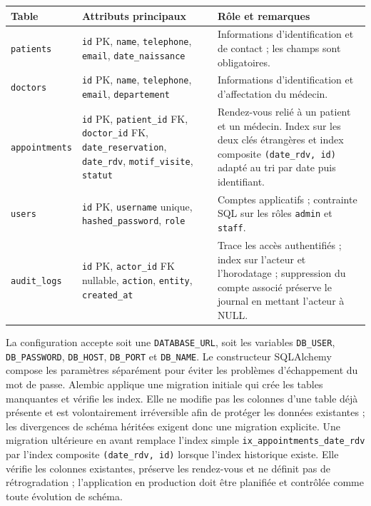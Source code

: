 \documentclass[11pt,a4paper]{report}
\newcommand{\code}[1]{\texttt{#1}}
\begin{document}
\begin{longtable}{>{\raggedright\arraybackslash}p{2.6cm}
                  >{\raggedright\arraybackslash}p{4.3cm}
                  >{\raggedright\arraybackslash}p{6.9cm}}
\toprule
Table & Attributs principaux & Rôle et remarques\\
\midrule
\endhead
\code{patients} & \code{id} PK, \code{name}, \code{telephone},
\code{email}, \code{date\_naissance} & Informations d'identification et de
contact ; les champs sont obligatoires.\\
\code{doctors} & \code{id} PK, \code{name}, \code{telephone},
\code{email}, \code{departement} & Informations d'identification et
d'affectation du médecin.\\
\code{appointments} & \code{id} PK, \code{patient\_id} FK,
\code{doctor\_id} FK, \code{date\_reservation}, \code{date\_rdv},
\code{motif\_visite}, \code{statut} & Rendez-vous relié à un patient et un
médecin. Index sur les deux clés étrangères et index composite
\code{(date\_rdv, id)} adapté au tri par date puis identifiant.\\
\code{users} & \code{id} PK, \code{username} unique,
\code{hashed\_password}, \code{role} & Comptes applicatifs ; contrainte SQL
sur les rôles \code{admin} et \code{staff}.\\
\code{audit\_logs} & \code{id} PK, \code{actor\_id} FK nullable,
\code{action}, \code{entity}, \code{created\_at} & Trace les accès
authentifiés ; index sur l'acteur et l'horodatage ; suppression du compte
associé préserve le journal en mettant l'acteur à NULL.\\
\bottomrule
\end{longtable}

La configuration accepte soit une \code{DATABASE\_URL}, soit les variables
\code{DB\_USER}, \code{DB\_PASSWORD}, \code{DB\_HOST}, \code{DB\_PORT} et
\code{DB\_NAME}. Le constructeur SQLAlchemy compose les paramètres séparément
pour éviter les problèmes d'échappement du mot de passe. Alembic applique une
migration initiale qui crée les tables manquantes et vérifie les index. Elle
ne modifie pas les colonnes d'une table déjà présente et est volontairement
irréversible afin de protéger les données existantes ; les divergences de
schéma héritées exigent donc une migration explicite. Une migration ultérieure
en avant remplace l'index simple \code{ix\_appointments\_date\_rdv} par
l'index composite \code{(date\_rdv, id)} lorsque l'index historique existe.
Elle vérifie les colonnes existantes, préserve les rendez-vous et ne définit
pas de rétrogradation ; l'application en production doit être planifiée et
contrôlée comme toute évolution de schéma.
\end{document}
